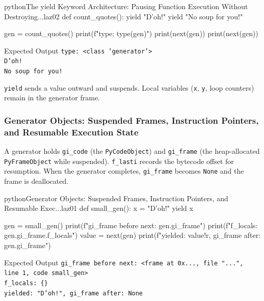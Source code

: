 \documentclass[a4paper,twoside]{report}
\begin{document}
\begin{codebox}[]{python}{The yield Keyword Architecture: Pausing Function Execution Without Destroying...}{laz02}
def count_quotes():
    yield "D'oh!"
    yield "No soup for you!"

gen = count_quotes()
print(f"type: {type(gen)}")
print(next(gen))
print(next(gen))
\end{codebox}


\begin{iobox}{Expected Output}
\texttt{type: <class 'generator'>} \\
\texttt{D'oh!} \\
\texttt{No soup for you!} \\
\end{iobox}




\texttt{yield} sends a value outward and suspends. Local variables (\texttt{x}, \texttt{y}, loop counters) remain in the generator frame.

\subsubsection{Generator Objects: Suspended Frames, Instruction Pointers, and Resumable Execution State}

A generator holds \texttt{gi\_code} (the \texttt{PyCodeObject}) and \texttt{gi\_frame} (the heap-allocated \texttt{PyFrameObject} while suspended). \texttt{f\_lasti} records the bytecode offset for resumption. When the generator completes, \texttt{gi\_frame} becomes \texttt{None} and the frame is deallocated.

\begin{codebox}[]{python}{Generator Objects: Suspended Frames, Instruction Pointers, and Resumable Exec...}{laz01}
def small_gen():
    x = "D'oh!"
    yield x

gen = small_gen()
print(f"gi_frame before next: {gen.gi_frame}")
print(f"f_locals: {gen.gi_frame.f_locals}")
value = next(gen)
print(f"yielded: {value!r}, gi_frame after: {gen.gi_frame}")
\end{codebox}


\begin{iobox}{Expected Output}
\texttt{gi\_frame before next: <frame at 0x..., file "...", line 1, code small\_gen>} \\
\texttt{f\_locals: \{\}} \\
\texttt{yielded: "D'oh!", gi\_frame after: None} \\
\end{iobox}
\end{document}
